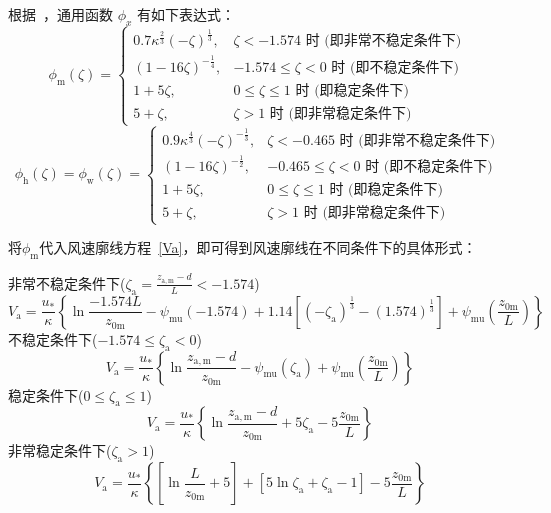 根据~\citet{zeng1998intercomparison}，通用函数 $\phi_x$ 有如下表达式：
\begin{equation}\label{phim_zeng}
  \phi_{\mathrm{m}}(\zeta)=\begin{cases}
    0.7 \kappa^{\frac{2}{3}}(-\zeta)^{\frac{1}{3}}, & \zeta<-1.574 \text { 时 (即非常不稳定条件下) } \\
    (1-16 \zeta)^{-\frac{1}{4}}, & -1.574 \leqslant \zeta<0 \text { 时 (即不稳定条件下) } \\
    1+5 \zeta, & 0 \leqslant \zeta \leqslant 1 \text { 时 (即稳定条件下) } \\
    5+\zeta, & \zeta>1 \text { 时 (即非常稳定条件下) }
  \end{cases}
\end{equation}
\begin{equation}
  \phi_{\mathrm{h}}(\zeta)=\phi_{\mathrm{w}}(\zeta)=\begin{cases}
    0.9 \kappa^{\frac{4}{3}}(-\zeta)^{-\frac{1}{3}}, & \zeta<-0.465 \text { 时 (即非常不稳定条件下) } \\
    (1-16 \zeta)^{-\frac{1}{2}}, & -0.465 \leqslant \zeta<0 \text { 时 (即不稳定条件下) } \\
    1+5 \zeta, & 0 \leqslant \zeta \leqslant 1 \text { 时 (即稳定条件下) } \\
    5+\zeta, & \zeta>1 \text { 时 (即非常稳定条件下) }
  \end{cases}
\end{equation}

将$\phi_{\mathrm m}$代入风速廓线方程~\eqref{Va}，即可得到风速廓线在不同条件下的具体形式：

\noindent 非常不稳定条件下($\zeta_{\mathrm{a}}=\frac{z_{\mathrm{a,m}}-d}{L}<-1.574$)
\begin{equation}\label{Va_VU}
  V_{\mathrm{a}}=\frac{u_{*}}{\kappa}\left\{\ln \frac{-1.574 L}{z_{\mathrm{0 m}}}-\psi_{\mathrm{mu}}(-1.574)+
  1.14\left[\left(-\zeta_{\mathrm{a}}\right)^{\frac{1}{3}}-(1.574)^{\frac{1}{3}}\right]+\psi_{\mathrm{mu}}\left(\frac{z_{\mathrm{0 m}}}{L}\right)\right\}
\end{equation}
不稳定条件下($-1.574\leqslant\zeta_{\mathrm{a}}<0$)
\begin{equation}\label{Va_U}
  V_{\mathrm{a}}=\frac{u_{*}}{\kappa}\left\{\ln \frac{z_{\mathrm{a, m}}-d}{z_{\mathrm{0 m}}}-\psi_{\mathrm{mu}}\left(\zeta_{\mathrm{a}}\right)+\psi_{\mathrm{mu}}\left(\frac{z_{\mathrm{0 m}}}{L}\right)\right\}
\end{equation}
稳定条件下($0\leqslant\zeta_{\mathrm{a}}\leqslant1$)
\begin{equation}\label{Va_S}
  V_{\mathrm{a}}=\frac{u_{*}}{\kappa}\left\{\ln \frac{z_{\mathrm{a, m}}-d}{z_{\mathrm{0 m}}}+5 \zeta_{\mathrm{a}}-5 \frac{z_{\mathrm{0 m}}}{L}\right\}
\end{equation}
非常稳定条件下($\zeta_{\mathrm{a}}>1$)
\begin{equation}\label{Va_VS}
  V_{\mathrm{a}}=\frac{u_{*}}{\kappa}\left\{\left[\ln \frac{L}{z_{\mathrm{0 m}}}+5\right]+\left[5 \ln \zeta_{\mathrm{a}}+\zeta_{\mathrm{a}}-1\right]-5 \frac{z_{\mathrm{0 m}}}{L}\right\}
\end{equation}

